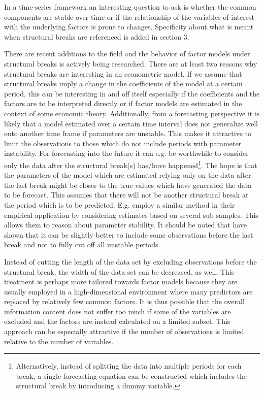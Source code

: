\documentclass[12pt]{article}
\begin{document}
In a time-series framework an interesting question to ask is whether the common components are stable over time or if the relationship of the variables of interest with the underlying factors is prone to changes. Specificity about what is meant when structural breaks are referenced is added in section 3. 

There are recent additions to the field and the behavior of factor models under structural breaks is actively being researched. There are at least two reasons why structural breaks are interesting in an econometric model. If we assume that structural breaks imply a change in the coefficients of the model at a certain period, this can be interesting in and off itself especially if the coefficients and the factors are to be interpreted directly or if factor models are estimated in the context of some economic theory. Additionally, from a forecasting perspective it is likely that a model estimated over a certain time interval does not generalize well onto another time frame if parameters are unstable. This makes it attractive to limit the observations to those which do not include periods with parameter instability. For forecasting into the future it can e.g. be worthwhile to consider only the data after the structural break(s) has/have happened\footnote{Alternatively, instead of splitting the data into multiple periods for each break, a single forecasting equation can be constructed which includes the structural break by introducing a dummy variable.}. The hope is that the parameters of the model which are estimated relying only on the data after the last break might be closer to the true values which have generated the data to be forecast. This assumes that there will not be another structural break at the period which is to be predicted. E.g. \citet{bai2008forecasting} employ a similar method in their empirical application by considering estimates based on several sub samples. This allows them to reason about parameter stability.
It should be noted that \citet{pesaran2007selection} have shown that it can be slightly better to include some observations before the last break and not to fully cut off all unstable periods.

Instead of cutting the length of the data set by excluding observations before the structural break, the width of the data set can be decreased, as well. This treatment is perhaps more tailored towards factor models because they are usually employed in a high-dimensional environment where many predictors are replaced by relatively few common factors. It is thus possible that the overall information content does not suffer too much if some of the variables are excluded and the factors are instead calculated on a limited subset. This approach can be especially attractive if the number of observations is limited relative to the number of variables.
\end{document}

